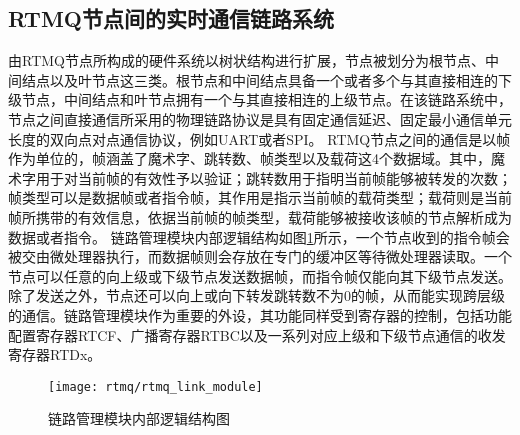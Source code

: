 \subsection[RTMQ节点间的实时通信链路系统]{RTMQ节点间的实时通信链路系统}
由RTMQ节点所构成的硬件系统以树状结构进行扩展，节点被划分为根节点、中间结点以及叶节点这三类。根节点和中间结点具备一个或者多个与其直接相连的下级节点，中间结点和叶节点拥有一个与其直接相连的上级节点。在该链路系统中，节点之间直接通信所采用的物理链路协议是具有固定通信延迟、固定最小通信单元长度的双向点对点通信协议，例如UART或者SPI。
RTMQ节点之间的通信是以帧作为单位的，帧涵盖了魔术字、跳转数、帧类型以及载荷这4个数据域。其中，魔术字用于对当前帧的有效性予以验证；跳转数用于指明当前帧能够被转发的次数；帧类型可以是数据帧或者指令帧，其作用是指示当前帧的载荷类型；载荷则是当前帧所携带的有效信息，依据当前帧的帧类型，载荷能够被接收该帧的节点解析成为数据或者指令。
链路管理模块内部逻辑结构如图\ref{fig:rtmq_link_module}所示，一个节点收到的指令帧会被交由微处理器执行，而数据帧则会存放在专门的缓冲区等待微处理器读取。一个节点可以任意的向上级或下级节点发送数据帧，而指令帧仅能向其下级节点发送。除了发送之外，节点还可以向上或向下转发跳转数不为0的帧，从而能实现跨层级的通信。链路管理模块作为重要的外设，其功能同样受到寄存器的控制，包括功能配置寄存器RTCF、广播寄存器RTBC以及一系列对应上级和下级节点通信的收发寄存器RTDx。

\begin{figure}
    \centering
    \caption[链路管理模块内部逻辑结构图]{链路管理模块内部逻辑结构图\label{fig:rtmq_link_module}}
    \texttt{[image: rtmq/rtmq\_link\_module]}
\end{figure}



